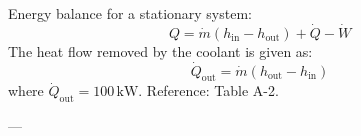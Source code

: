 Energy balance for a stationary system:  
\[
Q = \dot{m} (h_{\text{in}} - h_{\text{out}}) + \dot{Q} - \dot{W}
\]  
The heat flow removed by the coolant is given as:  
\[
\dot{Q}_{\text{out}} = \dot{m} (h_{\text{out}} - h_{\text{in}})
\]  
where \( \dot{Q}_{\text{out}} = 100 \, \text{kW} \).  
Reference: Table A-2.

---